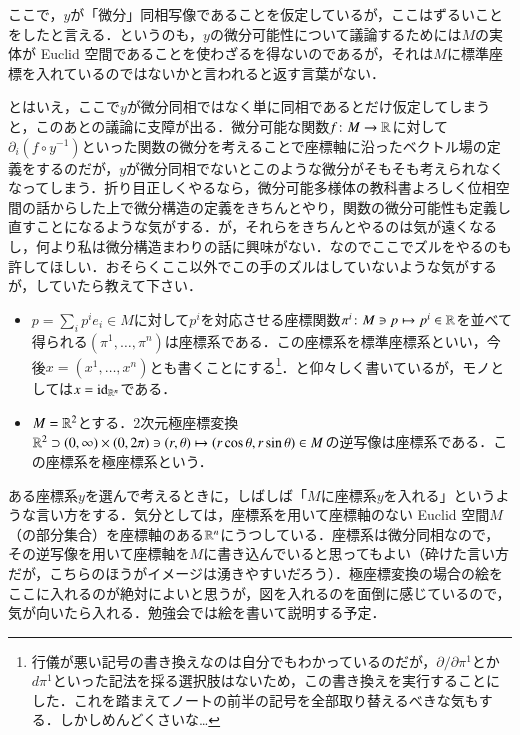 \begin{dig}
ここで，$y$が「微分」同相写像であることを仮定しているが，ここはずるいことをしたと言える．というのも，$y$の微分可能性について議論するためには$M$の実体が Euclid 空間であることを使わざるを得ないのであるが，それは$M$に標準座標を入れているのではないかと言われると返す言葉がない．

とはいえ，ここで$y$が微分同相ではなく単に同相であるとだけ仮定してしまうと，このあとの議論に支障が出る．微分可能な関数$f \colon M \to \mathbb{R}$に対して$\partial_i (f \circ y^{-1})$といった関数の微分を考えることで座標軸に沿ったベクトル場の定義をするのだが，$y$が微分同相でないとこのような微分がそもそも考えられなくなってしまう．折り目正しくやるなら，微分可能多様体の教科書よろしく位相空間の話からした上で微分構造の定義をきちんとやり，関数の微分可能性も定義し直すことになるような気がする．が，それらをきちんとやるのは気が遠くなるし，何より私は微分構造まわりの話に興味がない．なのでここでズルをやるのも許してほしい．おそらくここ以外でこの手のズルはしていないような気がするが，していたら教えて下さい．
\end{dig}

\begin{exm}[座標系の例]
\leavevmode
\begin{itemize}
\item $p = \sum_i p^i e_i \in M$に対して$p^i$を対応させる座標関数$\pi^i \colon M \ni p \mapsto p^i \in \mathbb{R}$を並べて得られる$(\pi^1, \dots, \pi^n)$は座標系である．この座標系を標準座標系といい，今後$x=(x^1, \dots, x^n)$とも書くことにする\footnote{行儀が悪い記号の書き換えなのは自分でもわかっているのだが，$\partial / \partial \pi ^1$とか$d\pi^1$といった記法を採る選択肢はないため，この書き換えを実行することにした．これを踏まえてノートの前半の記号を全部取り替えるべきな気もする．しかしめんどくさいな…}．と仰々しく書いているが，モノとしては$x = \operatorname{id}_{\mathbb{R}^n}$である．
\item $M = \mathbb{R}^2$とする．2次元極座標変換$\mathbb{R}^2 \supset (0, \infty) \times (0, 2\pi) \ni (r,\theta) \mapsto (r \cos \theta, r \sin \theta) \in M$の逆写像は座標系である．この座標系を極座標系という．
\end{itemize}
\end{exm}

ある座標系$y$を選んで考えるときに，しばしば「$M$に座標系$y$を入れる」というような言い方をする．気分としては，座標系を用いて座標軸のない Euclid 空間$M$（の部分集合）を座標軸のある$\mathbb{R}^n$にうつしている．座標系は微分同相なので，その逆写像を用いて座標軸を$M$に書き込んでいると思ってもよい（砕けた言い方だが，こちらのほうがイメージは湧きやすいだろう）．極座標変換の場合の絵をここに入れるのが絶対によいと思うが，図を入れるのを面倒に感じているので，気が向いたら入れる．勉強会では絵を書いて説明する予定．

